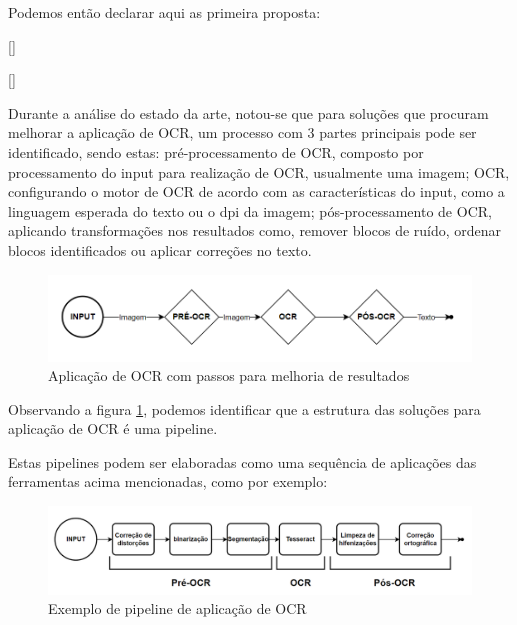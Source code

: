 Podemos então declarar aqui as primeira proposta: 

[\normalsize]

[\normalsize]

Durante a análise do estado da arte, notou-se que para soluções que procuram melhorar a aplicação de OCR, um processo com 3 partes principais pode ser identificado, sendo estas: pré-processamento de OCR, composto por processamento do input para realização de OCR, usualmente uma imagem; OCR, configurando o motor de OCR de acordo com as características do input, como a linguagem esperada do texto ou o dpi da imagem; pós-processamento de OCR, aplicando transformações nos resultados como, remover blocos de ruído, ordenar blocos identificados ou aplicar correções no texto. 

\begin{figure}[H]
     \centering
     \includegraphics[width=1\textwidth]{images/diagramas/pipeline_alto_nivel.png}
     \caption{Aplicação de OCR com passos para melhoria de resultados}
     \label{fig:pipeline_high_level}
\end{figure}
 
Observando a figura \ref{fig:pipeline_high_level}, podemos identificar que a estrutura das soluções para aplicação de OCR é uma pipeline.

Estas pipelines podem ser elaboradas como uma sequência de aplicações das ferramentas acima mencionadas, como por exemplo:

\begin{figure}[H]
	\centering
	\includegraphics[width=1\textwidth]{images/diagramas/pipeline_exemplo.png}
	\caption{Exemplo de pipeline de aplicação de OCR}
	\label{fig:pipeline_example}
\end{figure}
 
